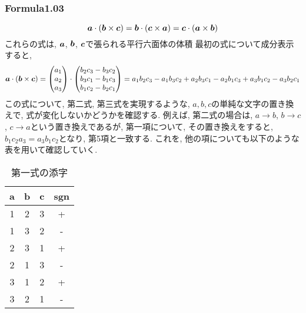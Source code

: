 \documentclass{jsarticle}
\newcommand*{\mbold}[1]{\mbox{\boldmath $#1$}}
\begin{document}
\begin{enumerate}
\subsubsection*{Formula1.03}
\[
  \mbold{a} \cdot (\mbold{b} \times \mbold{c}) = \mbold{b} \cdot (\mbold{c} \times \mbold{a}) = \mbold{c} \cdot (\mbold{a} \times \mbold{b})
\]
これらの式は, $\mbold{a}$, $\mbold{b}$, $\mbold{c}$で張られる平行六面体の体積
最初の式について成分表示すると, 
\[
  \mbold{a} \cdot (\mbold{b} \times \mbold{c}) = 
  \begin{pmatrix}
        a_1 \\
        a_2 \\
        a_3
  \end{pmatrix}
  \cdot
  \begin{pmatrix}
    b_2 c_3 - b_3 c_2 \\
    b_3 c_1 - b_1 c_3 \\
    b_1 c_2 - b_2 c_1
  \end{pmatrix}
  = a_1 b_2 c_3 - a_1 b_3 c_2 + a_2 b_3 c_1 - a_2 b_1 c_3 + a_3 b_1 c_2 - a_3 b_2 c_1
\]
この式について, 第二式, 第三式を実現するような, $a, b, c$の単純な文字の置き換えで, 式が変化しないかどうかを確認する. 
例えば, 第二式の場合は, $a \rightarrow b$, $b \rightarrow c$, $c \rightarrow a$という置き換えであるが, 第一項について, その置き換えをすると, $b_1 c_2 a_3 = a_3 b_1 c_2$となり, 第5項と一致する. これを, 他の項についても以下のような表を用いて確認していく. 
\begin{table}[hbtp]
  \caption{第一式の添字}
  \centering
  \begin{tabular}{|c|c|c|c|}
    \hline
    a & b & c & sgn \\
    \hline \hline
    1 & 2 & 3 & + \\
    \hdashline
    \rowcolor{yellow}1 & 3 & 2 & - \\
    \hdashline
    \rowcolor{green}2 & 3 & 1 & + \\
    \hdashline
    \rowcolor{red}2 & 1 & 3 & - \\
    \hdashline
    \rowcolor{cyan}3 & 1 & 2 & + \\
    \hdashline
    \rowcolor{magenta}3 & 2 & 1 & - \\
    \hline
  \end{tabular}
\end{table}


\end{enumerate}
\end{document}
